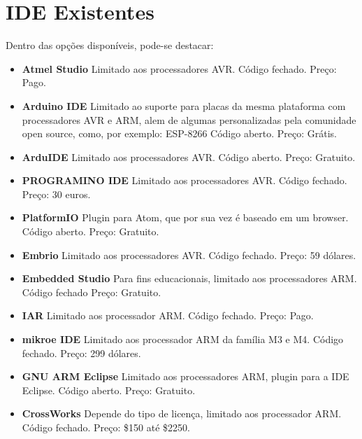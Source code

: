 \section{IDE Existentes}
Dentro das opções disponíveis, pode-se destacar:
\begin{itemize}
 \item \textbf{Atmel Studio}
 \subitem Limitado aos processadores AVR.
 \subitem Código fechado.
 \subitem Preço: Pago.

 \item \textbf{Arduino IDE}
 \subitem Limitado ao suporte para placas da mesma plataforma com processadores AVR e ARM, alem de algumas personalizadas
 pela comunidade open source, como, por exemplo: ESP-8266
 \subitem Código aberto.
 \subitem Preço: Grátis.

 \item \textbf{ArduIDE}
 \subitem Limitado aos processadores AVR.
 \subitem Código aberto.
 \subitem Preço: Gratuito.

 \item \textbf{PROGRAMINO IDE}
 \subitem Limitado aos processadores AVR.
 \subitem Código fechado.
 \subitem Preço: 30 euros.

 \item \textbf{PlatformIO}
 \subitem Plugin para Atom, que por sua vez é baseado em um browser.
 \subitem Código aberto.
 \subitem Preço: Gratuito.

 \item \textbf{Embrio}
 \subitem Limitado aos processadores AVR.
 \subitem Código fechado.
 \subitem Preço: 59 dólares.

 \item \textbf{Embedded Studio}
 \subitem Para fins educacionais, limitado aos processadores ARM.
 \subitem Código fechado
 \subitem Preço: Gratuito.

 \item \textbf{IAR}
 \subitem Limitado aos processador ARM.
 \subitem Código fechado.
 \subitem Preço: Pago.

 \item \textbf{mikroe IDE}
 \subitem Limitado aos processador ARM da família M3 e M4.
 \subitem Código fechado.
 \subitem Preço: 299 dólares.

 \item \textbf{GNU ARM Eclipse}
 \subitem Limitado aos processadores ARM, plugin para a IDE Eclipse.
 \subitem Código aberto.
 \subitem Preço: Gratuito.

 \item \textbf{CrossWorks}
 \subitem Depende do tipo de licença, limitado aos processador ARM.
 \subitem Código fechado.
 \subitem Preço: \$150 até \$2250.


\end{itemize}
